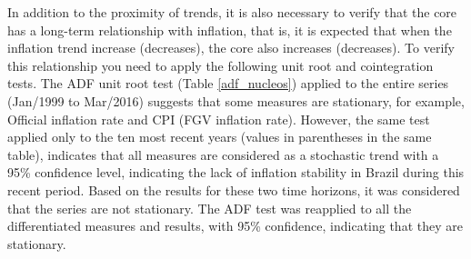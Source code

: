\documentclass[10pt]{article}
\begin{document}

In addition to the proximity of trends, it is also necessary to verify that the core has a long-term relationship with inflation, that is, it is expected that when the inflation trend increase (decreases), the core also increases (decreases). To verify this relationship you need to apply the following unit root and cointegration tests. The ADF unit root test (Table \ref{adf_nucleos}) applied to the entire series (Jan/1999 to Mar/2016) suggests that some measures are stationary, for example, Official inflation rate and CPI (FGV inflation rate). However, the same test applied only to the ten most recent years (values in parentheses in the same table), indicates that all measures are considered as a stochastic trend with a 95\% confidence level, indicating the lack of inflation stability in Brazil during this recent period. Based on the results for these two time horizons, it was considered that the series are not stationary. The ADF test was reapplied to all the differentiated measures and results, with 95\% confidence, indicating that they are stationary.


\end{document}

